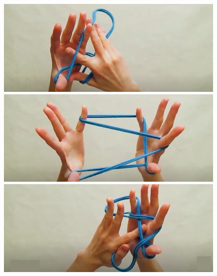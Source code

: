 \begin{multicols}{2}
	\begin{figure}[H]
		\vspace*{-5pt}
		\centering
		\captionsetup{labelformat= empty, justification=centering}
		\includegraphics[width=0.85\linewidth]{3a}
		
		\vspace*{1.8pt}
		\includegraphics[width=0.85\linewidth]{3b}
		
		\vspace*{2pt}
		\includegraphics[width=0.85\linewidth]{3c}
		

\end{figure}
\end{multicols}
